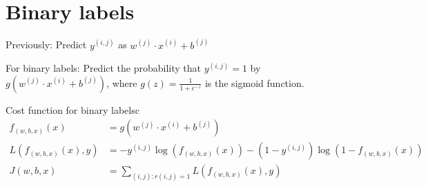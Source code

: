 \section{Binary labels}
Previously: Predict $y^{(i, j)}$ as $w^{(j)}\cdot x^{(i)} + b^{(j)}$

For binary labels: Predict the probability that $y^{(i, j)} = 1$ by $g(w^{(j)}\cdot x^{(i)} + b^{(j)})$, 
where $g(z) = \frac{1}{1 + e^{-z}}$ is the sigmoid function.

\begin{thmbox}{Cost function for binary labels}{c}
    \begin{align}
        f_{(w, b, x)}(x) &= g(w^{(j)}\cdot x^{(i)} + b^{(j)})\\
        L(f_{(w, b, x)}(x), y) &= -y^{(i, j)} \log(f_{(w, b, x)}(x)) - (1 - y^{(i, j)}) \log(1 - f_{(w, b, x)}(x))\\
        J(w, b, x) &= \sum_{(i,j):r(i, j) = 1} L(f_{(w, b, x)}(x), y)
    \end{align} 
\end{thmbox}